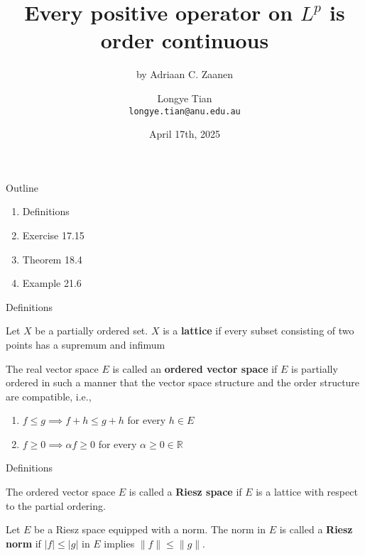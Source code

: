 \documentclass[aspectratio=169]{beamer} %
\title[Zaanen]{Every positive operator on $L^p$ is order continuous}
\subtitle{by Adriaan C. Zaanen}
\author[Longye]{Longye Tian \\ \texttt{longye.tian@anu.edu.au}}
\institute[ANU]{Australian National University\\ School of Economics}
\date{April 17th, 2025}
\begin{document}
\begin{frame}
  \titlepage
\end{frame}

\begin{frame}{Outline}
  \begin{enumerate}
  \item Definitions
  \item Exercise 17.15
  \item Theorem 18.4
  \item Example 21.6
  \end{enumerate}
\end{frame}

\begin{frame}{Definitions}
    \begin{definition}
        Let $X$ be a partially ordered set. $X$ is a \textbf{lattice} if every subset consisting of two points has a supremum and infimum
    \end{definition}
    \begin{definition}
        The real vector space $E$ is called an \textbf{ordered vector space} if $E$ is partially ordered in such a manner that the vector space structure and the order structure are compatible, i.e.,
        \begin{enumerate}
            \item $f\le g\implies f+h\le g+h$ for every $h\in E$
            \item $f\ge 0\implies \alpha f\ge 0$ for every $\alpha \ge 0\in \mathbb{R}$
        \end{enumerate}
    \end{definition}
\end{frame}

\begin{frame}{Definitions}
\begin{definition}
The ordered vector space $E$ is called a \textbf{Riesz space} if $E$ is a lattice with respect to the partial ordering.
\end{definition}

\begin{definition}
    Let $E$ be a Riesz space equipped with a norm. The norm in $E$ is called a \textbf{Riesz norm} if $|f|\le |g|$ in $E$ implies $\|f\|\le \|g\|$.
\end{definition}
\end{frame}
\end{document}
